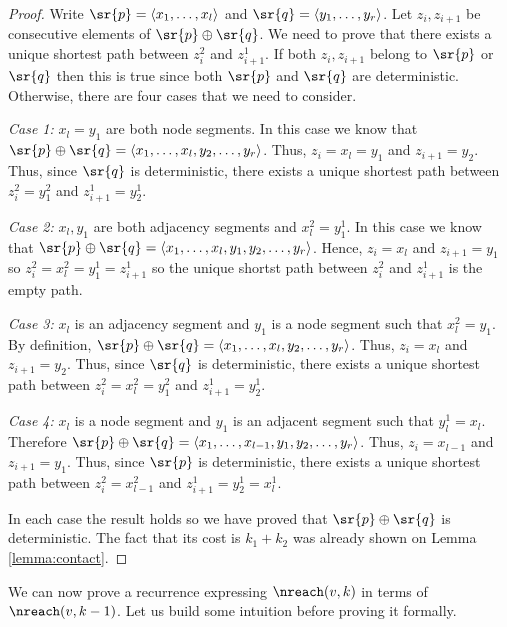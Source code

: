 \begin{proof}
Write $\sr{p} = \langle x_1, \ldots, x_l \rangle$ and 
$\sr{q} = \langle y_1, \ldots, y_r \rangle$.
Let $z_i, z_{i + 1}$ be consecutive elements of $\sr{p} \oplus \sr{q}$. 
We need to prove that
there exists a unique shortest path between $z^2_i$ and $z^1_{i + 1}$.
If both $z_i, z_{i + 1}$ belong to $\sr{p}$ or $\sr{q}$ then this is true since both
$\sr{p}$ and $\sr{q}$ are deterministic. Otherwise, there are four cases that we need
to consider.

\emph{Case 1:} $x_l = y_1$ are both node segments. In this case we know that
$\sr{p} \oplus \sr{q} = \langle x_1, \ldots, x_l, y_2, \ldots, y_r \rangle$.
Thus, $z_i = x_l = y_1$ and $z_{i + 1} = y_2$. Thus, since $\sr{q}$ is deterministic,
there exists a unique shortest path between $z^2_i = y^2_1$ and $z^1_{i + 1} = y^1_2$.

\emph{Case 2:} $x_l,  y_1$ are both adjacency segments and 
$x^2_l = y^1_1$. In this case we know that
$\sr{p} \oplus \sr{q} = \langle x_1, \ldots, x_l, y_1, y_2, \ldots, y_r \rangle$.
Hence, $z_i = x_l$ and $z_{i + 1} = y_1$ so $z^2_i = x^2_l = y^1_1 = z^1_{i + 1}$ so
the unique shortst path between $z^2_i$ and $z^1_{i + 1}$ is the empty path.

\emph{Case 3:} $x_l$ is an adjacency segment and $y_1$ is a node segment such that
$x^2_l = y_1$. By definition, 
$\sr{p} \oplus \sr{q} = \langle x_1, \ldots, x_l, y_2, \ldots, y_r \rangle$.
Thus, $z_i = x_l$ and $z_{i + 1} = y_2$. Thus, since $\sr{q}$ is deterministic,
there exists a unique shortest path between $z^2_i = x^2_l = y^2_1$ and $z^1_{i + 1} = y^1_2$.

\emph{Case 4:} $x_l$ is a node segment and $y_1$ is an adjacent segment such that
$y^1_l = x_l$. Therefore $\sr{p} \oplus \sr{q} = \langle x_1, \ldots, x_{l - 1}, y_1, y_2, \ldots, y_r \rangle$.
Thus, $z_i = x_{l - 1}$ and $z_{i + 1} = y_1$. Thus, since $\sr{p}$ is deterministic,
there exists a unique shortest path between $z^2_i = x^2_{l - 1}$ and $z^1_{i + 1} = y^1_2 = x^1_l$.

In each case the result holds so we have proved that $\sr{p} \oplus \sr{q}$ is
deterministic. The fact that its cost is $k_1 + k_2$ was already shown on Lemma 
\ref{lemma:contact}. 
\end{proof}

We can now prove a recurrence expressing $\nreach(v, k)$ in terms of
$\nreach(v, k - 1)$. Let us build some intuition before proving it formally.


